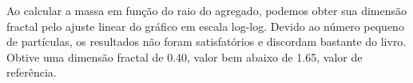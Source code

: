 \documentclass[a4paper, brazil]{article}
\begin{document}
Ao calcular a massa em função do raio do agregado, podemos obter sua dimensão fractal pelo ajuste linear do gráfico em escala log-log.
Devido ao número pequeno de partículas, os resultados não foram satisfatórios e discordam bastante do livro.
Obtive uma dimensão fractal de \num{0.40}, valor bem abaixo de \num{1.65}, valor de referência.
\end{document}
